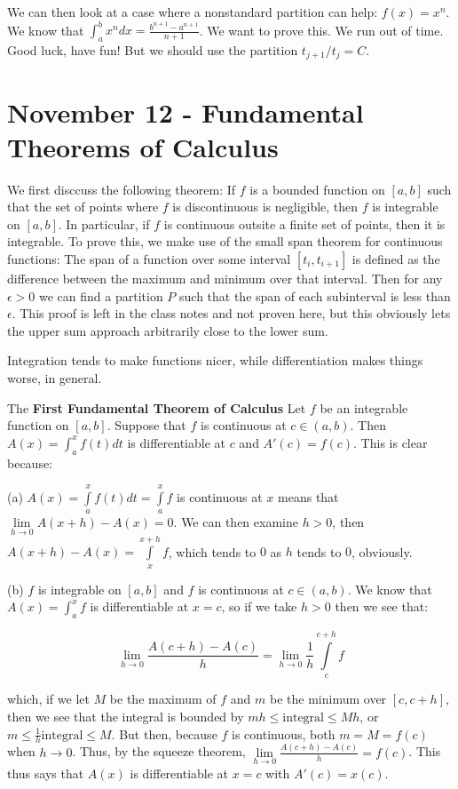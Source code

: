 \documentclass{report}
\begin{document}
We can then look at a case where a nonstandard partition can help: $f(x) = x^n$. We know that $\int_a^b{x^n dx} = \frac{b^{n+1}-a^{n+1}}{n+1}$. We want to prove this. We run out of time. Good luck, have fun! But we should use the partition $t_{j+1}/t_j = C$. 

\chapter{November 12 - Fundamental Theorems of Calculus}

We first disccuss the following theorem: If $f$ is a bounded function on $[a,b]$ such that the set of points where $f$ is discontinuous is negligible, then $f$ is integrable on $[a,b]$. In particular, if $f$ is continuous outsite a finite set of points, then it is integrable. To prove this, we make use of the small span theorem for continuous functions: The span of a function over some interval $[t_i, t_{i+1}]$ is defined as the difference between the maximum and minimum over that interval. Then for any $\epsilon > 0$ we can find a partition $P$ such that the span of each subinterval is less than $\epsilon$. This proof is left in the class notes and not proven here, but this obviously lets the upper sum approach arbitrarily close to the lower sum.

Integration tends to make functions nicer, while differentiation makes things worse, in general. 

The \textbf{First Fundamental Theorem of Calculus} Let $f$ be an integrable function on $[a,b]$. Suppose that $f$ is continuous at $c \in (a,b)$. Then $A(x) = \int_a^x{f(t)dt}$ is differentiable at $c$ and $A'(c) = f(c)$. This is clear because:

(a) $A(x) = \displaystyle\int\limits_a^x f(t) dt = \displaystyle\int\limits_a^x f$ is continuous at $x$ means that $\displaystyle\lim\limits_{h \to 0} A(x+h) - A(x) = 0$. We can then examine $h > 0$, then $A(x+h) - A(x) = \displaystyle\int\limits_x^{x+h} f$, which tends to $0$ as $h$ tends to $0$, obviously.

(b) $f$ is integrable on $[a,b]$ and $f$ is continuous at $c \in (a,b)$. We know that $A(x) = \displaystyle\int_a^x f$ is differentiable at $x = c$, so if we take $h > 0$ then we see that:

$$\displaystyle\lim\limits_{h \to 0} \frac{A(c+h) - A(c)}{h} = \displaystyle\lim\limits_{h \to 0} \frac{1}{h}\displaystyle\int\limits_c^{c+h}f$$

which, if we let $M$ be the maximum of $f$ and $m$ be the minimum over $[c,c+h]$, then we see that the integral is bounded by $mh \leq \text{integral} \leq Mh$, or $m \leq \frac{1}{h} \text{integral} \leq M$. But then, because $f$ is continuous, both $m = M = f(c)$ when $h \to 0$. Thus, by the squeeze theorem, $\displaystyle\lim\limits_{h \to 0} \frac{A(c+h) - A(c)}{h} = f(c)$. This thus says that $A(x)$ is differentiable at $x = c$ with $A'(c) = x(c)$. 
\end{document}
